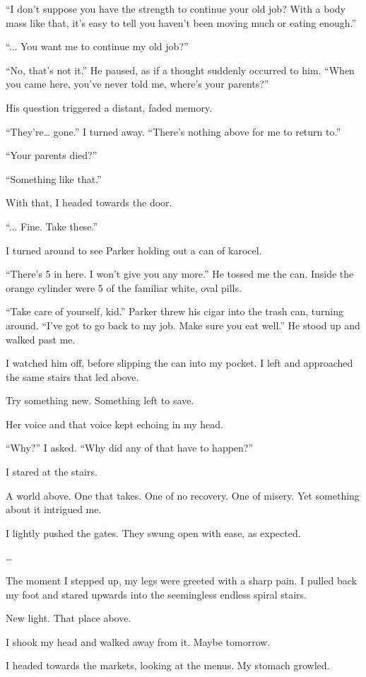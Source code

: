 “I don’t suppose you have the strength to continue your old job? With a body mass like that, it’s easy to tell you haven’t been moving much or eating enough.”

“... You want me to continue my old job?”

“No, that’s not it.” He paused, as if a thought suddenly occurred to him. “When you came here, you’ve never told me, where’s your parents?”

His question triggered a distant, faded memory.

“They’re… gone.” I turned away. “There’s nothing above for me to return to.”

“Your parents died?”

“Something like that.”

With that, I headed towards the door.

“... Fine. Take these.”

I turned around to see Parker holding out a can of karocel.

“There’s 5 in here. I won’t give you any more.” He tossed me the can. Inside the orange cylinder were 5 of the familiar white, oval pills.

“Take care of yourself, kid.” Parker threw his cigar into the trash can, turning around. “I’ve got to go back to my job. Make sure you eat well.” He stood up and walked past me.

I watched him off, before slipping the can into my pocket. I left and approached the same stairs that led above.

Try something new. Something left to save.

Her voice and that voice kept echoing in my head.

“Why?” I asked. “Why did any of that have to happen?”

I stared at the stairs.

A world above. One that takes. One of no recovery. One of misery. Yet something about it intrigued me.

I lightly pushed the gates. They swung open with ease, as expected.

…

The moment I stepped up, my legs were greeted with a sharp pain. I pulled back my foot and stared upwards into the seemingless endless spiral stairs.

New light. That place above.

I shook my head and walked away from it. Maybe tomorrow.

I headed towards the markets, looking at the menus. My stomach growled.

